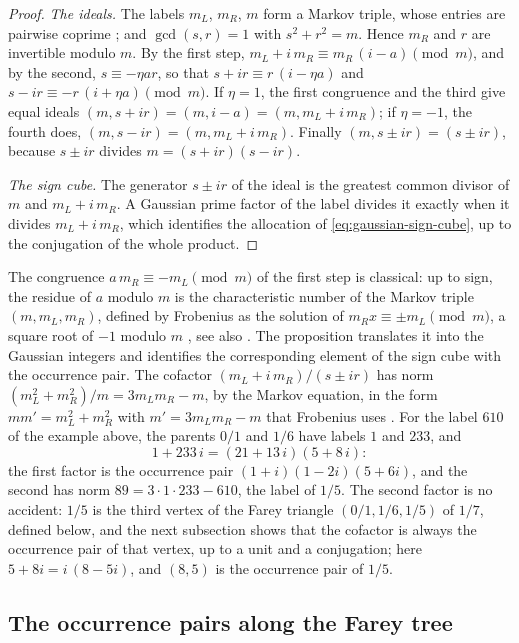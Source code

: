 \begin{proof}
\emph{The ideals.} The labels $m_L$, $m_R$, $m$ form a Markov triple, whose
entries are pairwise coprime \cite{Aigner2013}; and $\gcd(s,r)=1$ with
$s^2+r^2=m$. Hence $m_R$ and $r$ are invertible modulo $m$. By the first step,
$m_L+i\,m_R\equiv m_R\,(i-a)\pmod m$, and by the second, $s\equiv-\eta ar$, so that
$s+ir\equiv r\,(i-\eta a)$ and $s-ir\equiv-r\,(i+\eta a)\pmod m$. If $\eta=1$, the
first congruence and the third give equal ideals
$(m,s+ir)=(m,i-a)=(m,m_L+i\,m_R)$; if $\eta=-1$, the fourth does,
$(m,s-ir)=(m,m_L+i\,m_R)$. Finally $(m,s\pm ir)=(s\pm ir)$, because $s\pm ir$
divides $m=(s+ir)(s-ir)$.

\emph{The sign cube.} The generator $s\pm ir$ of the ideal is the greatest
common divisor of $m$ and $m_L+i\,m_R$. A Gaussian prime factor of the label
divides it exactly when it divides $m_L+i\,m_R$, which identifies the
allocation of \eqref{eq:gaussian-sign-cube}, up to the conjugation of the
whole product.
\end{proof}

The congruence $a\,m_R\equiv-m_L\pmod m$ of the first step is classical:
up to sign, the residue of $a$ modulo $m$ is the characteristic number of
the Markov triple $(m,m_L,m_R)$, defined by Frobenius as the solution of
$m_Rx\equiv\pm m_L\pmod m$, a square root of $-1$ modulo $m$
\cite[\S2, p.~462]{Frobenius1913}, see also \cite[Section~2.2]{Aigner2013}.
The proposition translates it into the Gaussian integers and identifies the
corresponding element of the sign cube with the occurrence pair.
The cofactor $(m_L+i\,m_R)/(s\pm ir)$ has norm
$(m_L^2+m_R^2)/m=3m_Lm_R-m$, by the Markov equation, in the form
$mm'=m_L^2+m_R^2$ with $m'=3m_Lm_R-m$ that Frobenius uses
\cite[\S1, p.~460]{Frobenius1913}. For the label $610$ of
the example above, the parents $0/1$ and $1/6$ have labels $1$ and $233$, and
$$
 1+233\,i=(21+13\,i)(5+8\,i):
$$
the first factor is the occurrence pair $(1+i)(1-2i)(5+6i)$, and the second
has norm $89=3\cdot1\cdot233-610$, the label of $1/5$. The second factor is no
accident: $1/5$ is the third vertex of the Farey triangle $(0/1,1/6,1/5)$ of
$1/7$, defined below, and the next subsection shows that the cofactor is
always the occurrence pair of that vertex, up to a unit and a conjugation;
here $5+8i=i\,(8-5i)$, and $(8,5)$ is the occurrence pair of $1/5$.

\subsection{The occurrence pairs along the Farey tree}\label{sec:vieta-jump}

